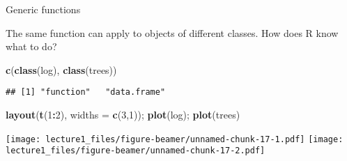 \documentclass[ignorenonframetext,]{beamer}
\newenvironment{Shaded}{\begin{snugshade}}{\end{snugshade}}
\newcommand{\DataTypeTok}[1]{\textcolor[rgb]{0.13,0.29,0.53}{#1}}
\newcommand{\DecValTok}[1]{\textcolor[rgb]{0.00,0.00,0.81}{#1}}
\newcommand{\KeywordTok}[1]{\textcolor[rgb]{0.13,0.29,0.53}{\textbf{#1}}}
\newcommand{\NormalTok}[1]{#1}
\newcommand{\OperatorTok}[1]{\textcolor[rgb]{0.81,0.36,0.00}{\textbf{#1}}}
\begin{document}
\begin{frame}[fragile]{Generic functions}
\protect\hypertarget{generic-functions}{}

The same function can apply to objects of different classes. How does R
know what to do?

\footnotesize

\begin{Shaded}
\begin{Highlighting}[]
\KeywordTok{c}\NormalTok{(}\KeywordTok{class}\NormalTok{(log), }\KeywordTok{class}\NormalTok{(trees))}
\end{Highlighting}
\end{Shaded}

\begin{verbatim}
## [1] "function"   "data.frame"
\end{verbatim}

\begin{Shaded}
\begin{Highlighting}[]
\KeywordTok{layout}\NormalTok{(}\KeywordTok{t}\NormalTok{(}\DecValTok{1}\OperatorTok{:}\DecValTok{2}\NormalTok{), }\DataTypeTok{widths =} \KeywordTok{c}\NormalTok{(}\DecValTok{3}\NormalTok{,}\DecValTok{1}\NormalTok{)); }\KeywordTok{plot}\NormalTok{(log); }\KeywordTok{plot}\NormalTok{(trees)}
\end{Highlighting}
\end{Shaded}

\texttt{[image: lecture1\_files/figure-beamer/unnamed-chunk-17-1.pdf]}
\texttt{[image: lecture1\_files/figure-beamer/unnamed-chunk-17-2.pdf]}

\end{frame}
\end{document}
